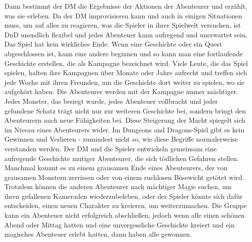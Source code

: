 Dann bestimmt der DM die Ergebnisse der Aktionen der Abenteurer und erzählt, was sie erleben. Da der DM improvisieren kann und auch in einigen Situationen muss, um auf alles zu reagieren, was die Spieler in ihrer Spielwelt versuchen, ist DnD unendlich flexibel und jedes Abenteuer kann aufregend und unerwartet sein. Das Spiel hat kein wirkliches Ende. Wenn eine Geschichte oder ein Quest abgeschlossen ist, kann eine andere beginnen und so kann man eine fortlaufende Geschichte erstellen, die als Kampagne bezeichnet wird. Viele Leute, die das Spiel spielen, halten ihre Kampagnen über Monate oder Jahre aufrecht und treffen sich jede Woche mit ihren Freunden, um die Geschichte dort weiter zu spielen, wo sie aufgehört haben. Die Abenteurer werden mit der Kampagne immer mächtiger. Jedes Monster, das besiegt wurde, jedes Abenteuer vollbracht und jeder gefundene Schatz trägt nicht nur zur weiteren Geschichte bei, sondern bringt den Abenteurern auch neue Fähigkeiten bei. Diese Steigerung der Macht spiegelt sich im Niveau eines Abenteurers wider. Im Dungeons and Dragons-Spiel gibt es kein Gewinnen und Verlieren - zumindest nicht so, wie diese Begriffe normalerweise verstanden werden. Der DM und die Spieler entwickeln gemeinsam eine aufregende Geschichte mutiger Abenteurer, die sich tödlichen Gefahren stellen. Manchmal kommt es zu einem grausamen Ende eines Abenteurers, der von grausamen Monstern zerrissen oder von einem ruchlosen Bösewicht getötet wird. Trotzdem können die anderen Abenteurer nach mächtiger Magie suchen, um ihren gefallenen Kameraden wiederzubeleben, oder der Spieler könnte sich dafür entscheiden, einen neuen Charakter zu kreieren, um weiterzumachen. Die Gruppe kann ein Abenteuer nicht erfolgreich abschließen, jedoch wenn alle einen schönen Abend oder Mittag hatten und eine unvergessliche Geschichte kreiert und ein magisches Abenteuer erlebt hatten, dann haben alle gewonnen.

